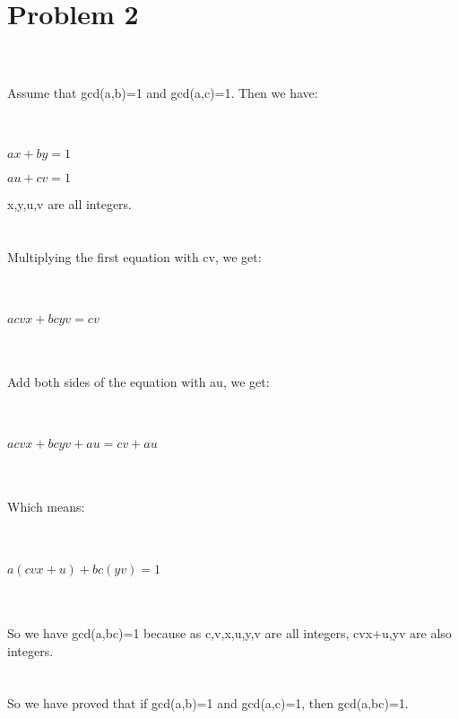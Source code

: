 \documentclass{article}
\begin{document}
\\ \hspace*{\fill} \\
\section{Problem 2}
\\ \hspace*{\fill} \\
Assume that gcd(a,b)=1 and gcd(a,c)=1. Then we have:\\
\\ \hspace*{\fill} \\
\centerline{$ax+by=1$}
\centerline{$au+cv=1$}
x,y,u,v are all integers.\\
\\ \hspace*{\fill} \\
Multiplying the first equation with cv, we get:\\
\\ \hspace*{\fill} \\
\centerline{$acvx+bcyv=cv$}
\\ \hspace*{\fill} \\
Add both sides of the equation with au, we get:\\
\\ \hspace*{\fill} \\
\centerline{$acvx+bcyv+au=cv+au$}
\\ \hspace*{\fill} \\
Which means:\\
\\ \hspace*{\fill} \\
\centerline{$a(cvx+u)+bc(yv)=1$}
\\ \hspace*{\fill} \\
So we have gcd(a,bc)=1 because as c,v,x,u,y,v are all integers, cvx+u,yv are also integers.\\
\\ \hspace*{\fill} \\
So we have proved that if gcd(a,b)=1 and gcd(a,c)=1, then gcd(a,bc)=1.\\
\\ \hspace*{\fill} \\
\end{document}
